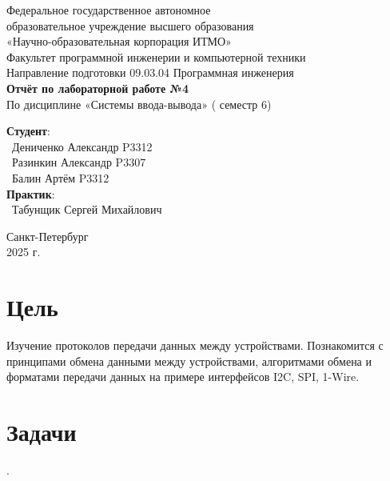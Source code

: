 \documentclass{article}
\begin{document}
\begin{center}
    \Large
    Федеральное государственное автономное \\
    образовательное учреждение высшего образования \\ 
    «Научно-образовательная корпорация ИТМО»\\
    \vspace{0.5cm}
    \large
    Факультет программной инженерии и компьютерной техники \\
    Направление подготовки 09.03.04 Программная инженерия \\
    \vspace{1cm}
    \Large
    \textbf{Отчёт по лабораторной работе №4} \\
        По дисциплине «Системы ввода-вывода» ( семестр 6)\\
    \large
    \vspace{8cm}

    \begin{minipage}{.33\textwidth}
    \end{minipage}
    \hfill
    \begin{minipage}{.4\textwidth}
    
        \textbf{Студент}: \vspace{.1cm} \\
        \ Дениченко Александр P3312\\
        \ Разинкин Александр P3307\\
        \ Балин Артём P3312\\
        \textbf{Практик}:  \\
        \ Табунщик Сергей Михайлович
    \end{minipage}
    \vfill
Санкт-Петербург\\ 2025 г.
\end{center}
\pagestyle{empty}
\newpage
\pagestyle{plain}

\section*{Цель}
Изучение протоколов передачи данных между устройствами.
Познакомится с принципами обмена данными между
устройствами, алгоритмами обмена и форматами передачи данных на
примере интерфейсов I2C, SPI, 1-Wire.
\section{Задачи}
.
\end{document}
